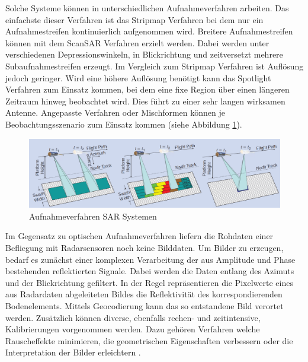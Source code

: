 
Solche Systeme können in unterschiedlichen Aufnahmeverfahren arbeiten. Das einfachste dieser Verfahren ist das Stripmap Verfahren bei dem nur ein Aufnahmestreifen
kontinuierlich aufgenommen wird. Breitere Aufnahmestreifen können mit dem ScanSAR Verfahren erzielt werden. Dabei werden unter verschiedenen Depressionswinkeln, 
in Blickrichtung und zeitversetzt mehrere Subaufnahmestreifen erzeugt. Im Vergleich zum Stripmap Verfahren ist Auflösung jedoch geringer. 
Wird eine höhere Auflösung benötigt kann das Spotlight Verfahren zum Einsatz kommen, bei dem eine fixe Region über einen längeren Zeitraum hinweg beobachtet wird. Dies führt zu 
einer sehr langen wirksamen Antenne. Angepasste Verfahren oder Mischformen können je Beobachtungsszenario zum Einsatz kommen (siehe Abbildung \ref{sar_scan_modi})\cite{tutorial_on_sar}. 

\begin{figure}[H]
    \centering
    \includegraphics[width=\textwidth]{Bilder/SAR_Modi.png}
    \caption{Aufnahmeverfahren SAR Systemen \cite{tutorial_on_sar}}
    \label{sar_scan_modi}
\end{figure}

Im Gegensatz zu optischen Aufnahmeverfahren liefern die Rohdaten 
einer Befliegung mit Radarsensoren noch keine Bilddaten. Um Bilder zu erzeugen, bedarf es zunächst einer komplexen Verarbeitung der aus Amplitude und Phase bestehenden 
reflektierten Signale. Dabei werden die Daten entlang des Azimuts und der Blickrichtung gefiltert. In der Regel repräsentieren die Pixelwerte eines aus Radardaten 
abgeleiteten Bildes die Reflektivität des korrespondierenden Bodenelements. Mittels Geocodierung kann das so entstandene Bild verortet werden. Zusätzlich können diverse,
ebenfalls rechen- und zeitintensive, Kalibrierungen vorgenommen werden. Dazu gehören Verfahren welche Rauscheffekte minimieren, die geometrischen Eigenschaften verbessern 
oder die Interpretation der Bilder erleichtern \cite{tutorial_on_sar}.

